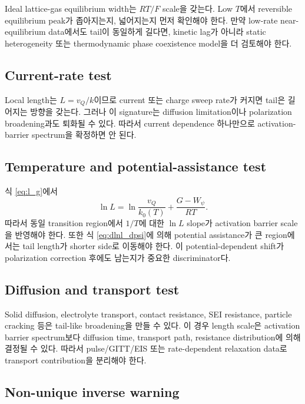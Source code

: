 \documentclass[11pt]{article}
\begin{document}
Ideal lattice-gas equilibrium width는 \(RT/F\) scale을 갖는다. Low \(T\)에서 reversible equilibrium
peak가 좁아지는지, 넓어지는지 먼저 확인해야 한다. 만약 low-rate near-equilibrium data에서도 tail이
동일하게 길다면, kinetic lag가 아니라 static heterogeneity 또는 thermodynamic phase coexistence
model을 더 검토해야 한다.

\subsection{Current-rate test}\label{subsec:current_test}

Local length는 \(L=v_Q/k\)이므로 current 또는 charge sweep rate가 커지면 tail은 길어지는 방향을
갖는다. 그러나 이 signature는 diffusion limitation이나 polarization broadening과도 퇴화될 수 있다.
따라서 current dependence 하나만으로 activation-barrier spectrum을 확정하면 안 된다.

\subsection{Temperature and potential-assistance test}\label{subsec:arrhenius_test}

식 \eqref{eq:l_g}에서
\begin{equation}
\ln L
=
\ln\frac{v_Q}{k_0(T)}
+
\frac{G-W_\psi}{RT}.
\label{eq:ln_l}
\end{equation}
따라서 동일 transition region에서 \(1/T\)에 대한 \(\ln L\) slope가 activation barrier scale을
반영해야 한다. 또한 식 \eqref{eq:dlnl_dpsi}에 의해 potential assistance가 큰 region에서는
tail length가 shorter side로 이동해야 한다. 이 potential-dependent shift가 polarization correction 후에도
남는지가 중요한 discriminator다.

\subsection{Diffusion and transport test}\label{subsec:transport_test}

Solid diffusion, electrolyte transport, contact resistance, SEI resistance, particle cracking 등은
tail-like broadening을 만들 수 있다. 이 경우 length scale은 activation barrier spectrum보다
diffusion time, transport path, resistance distribution에 의해 결정될 수 있다. 따라서 pulse/GITT/EIS
또는 rate-dependent relaxation data로 transport contribution을 분리해야 한다.

\subsection{Non-unique inverse warning}\label{subsec:non_unique}
\end{document}
